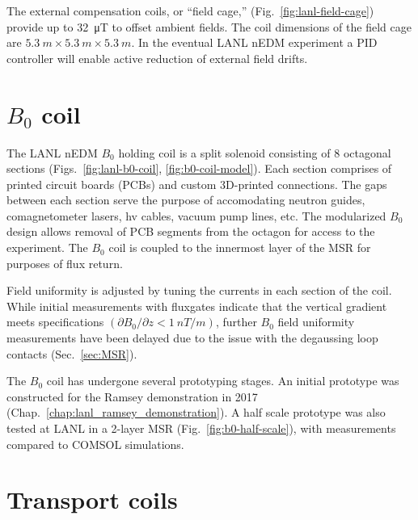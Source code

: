 The external compensation coils, or ``field cage,'' (Fig.~\ref{fig:lanl-field-cage}) provide up to \qty{32}{\micro\tesla} to offset ambient fields. The coil dimensions of the field cage are $\qty{5.3}{m}\times\qty{5.3}{m}\times\qty{5.3}{m}$. In the eventual LANL nEDM experiment a PID controller will enable active reduction of external field drifts.


\section{
    \texorpdfstring{$B_0$ coil}
                {B0 coil}\label{sec:B0_coil}
}


The LANL nEDM $B_0$ holding coil is a split solenoid consisting of 8 octagonal sections (Figs.~\ref{fig:lanl-b0-coil}, \ref{fig:b0-coil-model}). Each section comprises of printed circuit boards (PCBs) and custom 3D-printed connections. The gaps between each section serve the purpose of accomodating neutron guides, comagnetometer lasers, \acrshort*{hv} cables, vacuum pump lines, etc. The modularized $B_0$ design allows removal of PCB segments from the octagon for access to the experiment. The $B_0$ coil is coupled to the innermost layer of the MSR for purposes of flux return. 

Field uniformity is adjusted by tuning the currents in each section of the coil. While initial measurements with fluxgates indicate that the vertical gradient meets specifications $(\partial B_0/\partial z < \qty{1}{nT \per m})$, further $B_0$ field uniformity measurements have been delayed due to the issue with the degaussing loop contacts (Sec.~\ref{sec:MSR}).

The $B_0$ coil has undergone several prototyping stages. An initial prototype was constructed for the Ramsey demonstration in 2017 (Chap.~\ref{chap:lanl_ramsey_demonstration}). A half scale prototype was also tested at LANL in a 2-layer MSR (Fig.~\ref{fig:b0-half-scale}), with measurements compared to COMSOL simulations.


\section{Transport coils}\label{sec:transport_coils}


